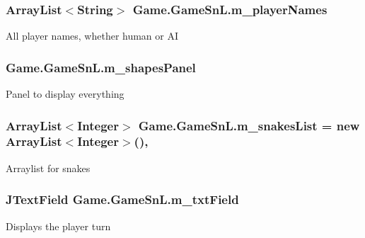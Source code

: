 \subsubsection[{m\+\_\+player\+Names}]{\setlength{\rightskip}{0pt plus 5cm}Array\+List$<$String$>$ Game.\+Game\+Sn\+L.\+m\+\_\+player\+Names\hspace{0.3cm}{\ttfamily [private]}}\label{class_game_1_1_game_sn_l_a0faf146bfc9f0bd5814b3b3c71c00a20}
All player names, whether human or A\+I \hypertarget{class_game_1_1_game_sn_l_af35fcedb0f8206713981e01068c3f281}{}
\subsubsection[{m\+\_\+shapes\+Panel}]{ Game.\+Game\+Sn\+L.\+m\+\_\+shapes\+Panel\hspace{0.3cm}{\ttfamily [private]}}\label{class_game_1_1_game_sn_l_af35fcedb0f8206713981e01068c3f281}
Panel to display everything \hypertarget{class_game_1_1_game_sn_l_a904b75e06e59aa1a9c028a948f98e33e}{}
\subsubsection[{m\+\_\+snakes\+List}]{\setlength{\rightskip}{0pt plus 5cm}Array\+List$<$Integer$>$ Game.\+Game\+Sn\+L.\+m\+\_\+snakes\+List = new Array\+List$<$Integer$>$()\hspace{0.3cm}{\ttfamily [static]}, {\ttfamily [private]}}\label{class_game_1_1_game_sn_l_a904b75e06e59aa1a9c028a948f98e33e}
Arraylist for snakes \hypertarget{class_game_1_1_game_sn_l_a0726c8332d62c46e936a13dc4d3abd1b}{}
\subsubsection[{m\+\_\+txt\+Field}]{\setlength{\rightskip}{0pt plus 5cm}J\+Text\+Field Game.\+Game\+Sn\+L.\+m\+\_\+txt\+Field\hspace{0.3cm}{\ttfamily [private]}}\label{class_game_1_1_game_sn_l_a0726c8332d62c46e936a13dc4d3abd1b}
Displays the player turn \hypertarget{class_game_1_1_game_sn_l_a942dda31e02524f87962efa42b2c2642}{}
